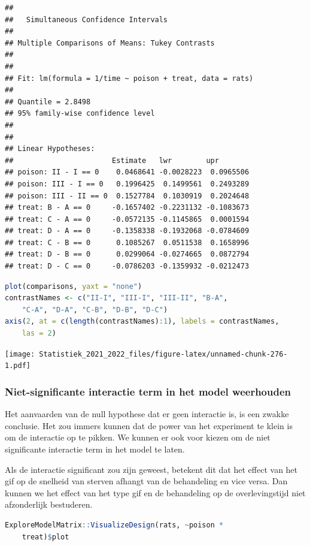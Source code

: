 \documentclass[
  12pt,dutch,coursenotes]{book}
\theoremstyle{definition}
\theoremstyle{definition}
\theoremstyle{definition}
\theoremstyle{definition}
\theoremstyle{remark}
\begin{document}
\begin{lstlisting}
## 
##   Simultaneous Confidence Intervals
## 
## Multiple Comparisons of Means: Tukey Contrasts
## 
## 
## Fit: lm(formula = 1/time ~ poison + treat, data = rats)
## 
## Quantile = 2.8498
## 95% family-wise confidence level
##  
## 
## Linear Hypotheses:
##                       Estimate   lwr        upr       
## poison: II - I == 0    0.0468641 -0.0028223  0.0965506
## poison: III - I == 0   0.1996425  0.1499561  0.2493289
## poison: III - II == 0  0.1527784  0.1030919  0.2024648
## treat: B - A == 0     -0.1657402 -0.2231132 -0.1083673
## treat: C - A == 0     -0.0572135 -0.1145865  0.0001594
## treat: D - A == 0     -0.1358338 -0.1932068 -0.0784609
## treat: C - B == 0      0.1085267  0.0511538  0.1658996
## treat: D - B == 0      0.0299064 -0.0274665  0.0872794
## treat: D - C == 0     -0.0786203 -0.1359932 -0.0212473
\end{lstlisting}

\begin{lstlisting}[language=R]
plot(comparisons, yaxt = "none")
contrastNames <- c("II-I", "III-I", "III-II", "B-A",
    "C-A", "D-A", "C-B", "D-B", "D-C")
axis(2, at = c(length(contrastNames):1), labels = contrastNames,
    las = 2)
\end{lstlisting}

\texttt{[image: Statistiek\_2021\_2022\_files/figure-latex/unnamed-chunk-276-1.pdf]}

\hypertarget{niet-significante-interactie-term-in-het-model-weerhouden}{%
\subsubsection{Niet-significante interactie term in het model weerhouden}\label{niet-significante-interactie-term-in-het-model-weerhouden}}

Het aanvaarden van de null hypothese dat er geen interactie is, is een zwakke conclusie.
Het zou immers kunnen dat de power van het experiment te klein is om de interactie op te pikken.
We kunnen er ook voor kiezen om de niet significante interactie term in het model te laten.

Als de interactie significant zou zijn geweest, betekent dit dat het effect van het gif op de snelheid van sterven afhangt van de behandeling en vice versa.
Dan kunnen we het effect van het type gif en de behandeling op de overlevingstijd niet afzonderlijk bestuderen.

\begin{lstlisting}[language=R]
ExploreModelMatrix::VisualizeDesign(rats, ~poison *
    treat)$plot
\end{lstlisting}
\end{document}
